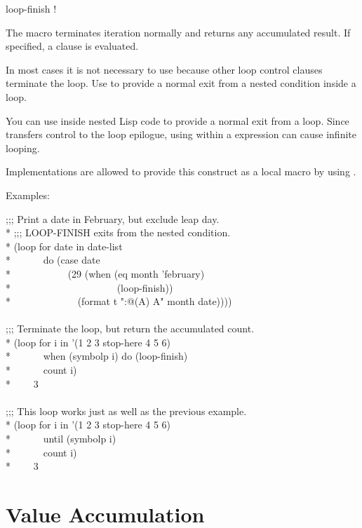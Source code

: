 \begin{defmac}
loop-finish \!!

The macro  terminates iteration normally
and returns any accumulated result.  If specified, a  clause
is evaluated.

In most cases it is not necessary to use 
because other loop control clauses terminate the loop.  
Use  to provide a normal exit
from a nested condition inside a loop.

You can use 
inside nested Lisp code to provide a normal exit from a loop.
Since  transfers control to the loop epilogue,
using  within a  expression can cause
infinite looping.


  Implementations are allowed to provide this construct as a local macro
  by using .

Examples:
\begin{lisp}
;;; Print a date in February, but exclude leap day. \\*
;;; LOOP-FINISH exits from the nested condition. \\*
(loop for date in date-list \\*
~~~~~~do (case date \\*
~~~~~~~~~~~(29 (when (eq month 'february) \\*
~~~~~~~~~~~~~~~~~~~~~(loop-finish)) \\*
~~~~~~~~~~~~~(format t "{\Xtilde}:@({\Xtilde}A{\Xtilde}) {\Xtilde}A" month date)))) \\
 \\
;;; Terminate the loop, but return the accumulated count. \\*
(loop for i in '(1 2 3 stop-here 4 5 6) \\*
~~~~~~when (symbolp i) do (loop-finish) \\*
~~~~~~count i) \\*
~~~\EV~3 \\
 \\
;;; This loop works just as well as the previous example. \\*
(loop for i in '(1 2 3 stop-here 4 5 6) \\*
~~~~~~until (symbolp i) \\*
~~~~~~count i) \\*
~~~\EV~3
\end{lisp}
\end{defmac}

\section{Value Accumulation}
\label{LOOP-ACCUM-SECTION}

